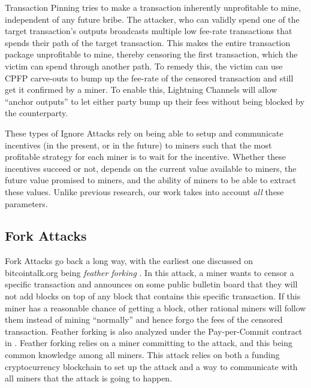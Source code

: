 Transaction Pinning \cite{transaction_pinning} tries to make a transaction inherently unprofitable to mine, independent of any future bribe. The attacker, who can validly spend one of the target transaction's outputs broadcasts multiple low fee-rate transactions that spends their path of the target transaction. This makes the entire transaction package unprofitable to mine, thereby censoring the first transaction, which the victim can spend through another path. To remedy this, the victim can use CPFP carve-outs \cite{cpfp_carveout} to bump up the fee-rate of the censored transaction and still get it confirmed by a miner. To enable this, Lightning Channels will allow ``anchor outputs'' \cite{anchor_outputs} to let either party bump up their fees without being blocked by the counterparty.

These types of Ignore Attacks rely on being able to setup and communicate incentives (in the present, or in the future) to miners such that the most profitable strategy for each miner is to wait for the incentive. Whether these incentives succeed or not, depends on the current value available to miners, the future value promised to miners, and the ability of miners to be able to extract these values. Unlike previous research, our work takes into account \textit{all} these parameters.

\subsection{Fork Attacks}
Fork Attacks go back a long way, with the earliest one discussed on bitcointalk.org being \emph{feather forking} \cite{feather_forking}. In this attack, a miner wants to censor a specific transaction and announces on some public bulletin board that they will not add blocks on top of any block that contains this specific transaction. If this miner has a reasonable chance of getting a block, other rational miners will follow them instead of mining ``normally'' and hence forgo the fees of the censored transaction. Feather forking is also analyzed under the Pay-per-Commit contract in \cite{temporary_censorship_attack_ethereum}. Feather forking relies on a miner committing to the attack, and this being common knowledge among all miners. This attack relies on both a funding cryptocurrency blockchain to set up the attack and a way to communicate with all miners that the attack is going to happen.  

